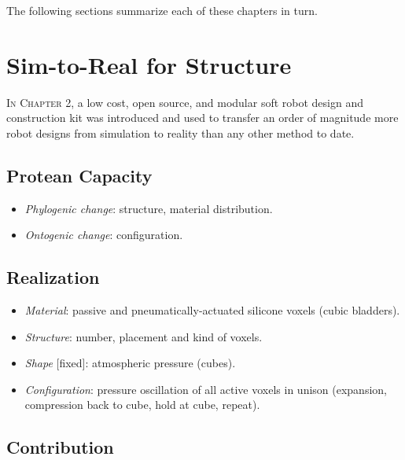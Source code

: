 The following sections summarize each of these 
chapters in turn.


\section{Sim-to-Real for Structure}

\textsc{In Chapter 2,}
a low cost, open source, and modular soft robot design and construction kit was introduced and used to
transfer an order of magnitude more robot designs from simulation to reality than any other method to date.

\subsection{Protean Capacity}

\begin{itemize}
    \item \textit{Phylogenic change}: structure, material distribution.
    \item \textit{Ontogenic change}: configuration.
\end{itemize}

\subsection{Realization}

\begin{itemize}
    \item \textit{Material}: passive and pneumatically-actuated silicone voxels (cubic bladders).
    \item \textit{Structure}: number, placement and kind of voxels.
    \item \textit{Shape} [fixed]: atmospheric pressure (cubes).
    \item \textit{Configuration}: pressure oscillation of all active voxels in unison (expansion, compression back to cube, hold at cube, repeat).
\end{itemize}



\subsection{Contribution}


